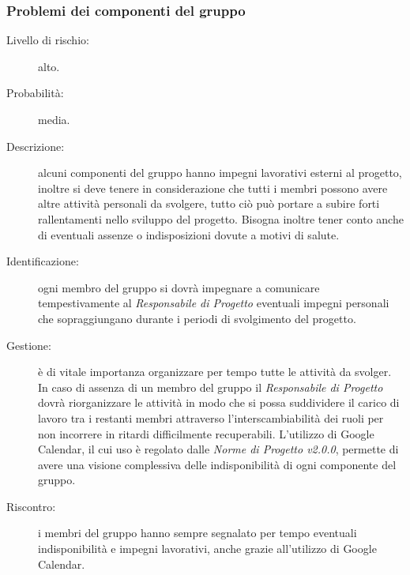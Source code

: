 \subsubsection{Problemi dei componenti del gruppo}
\begin{description}
	\item[Livello di rischio:] alto.
	\item[Probabilità:] media.
	\item[Descrizione:] alcuni componenti del gruppo hanno impegni lavorativi esterni al progetto, inoltre si deve tenere in considerazione che tutti i membri possono avere altre attività personali da svolgere, tutto ciò può portare a subire forti rallentamenti nello sviluppo del progetto. Bisogna inoltre tener conto anche di eventuali assenze o indisposizioni dovute a motivi di salute.
	\item[Identificazione:] ogni membro del gruppo si dovrà impegnare a comunicare tempestivamente al \textit{Responsabile di Progetto} eventuali impegni personali che sopraggiungano durante i periodi di svolgimento del progetto. 
	\item[Gestione:] è di vitale importanza organizzare per tempo tutte le attività da svolger. In caso di assenza di un membro del gruppo il \textit{Responsabile di Progetto} dovrà riorganizzare le attività in modo che si possa suddividere il carico di lavoro tra i restanti membri attraverso l'interscambiabilità dei ruoli per non incorrere in ritardi difficilmente recuperabili. L'utilizzo di \gls{Google Calendar}, il cui uso è regolato dalle \textit{Norme di Progetto v2.0.0}, permette di avere una visione complessiva delle indisponibilità di ogni componente del gruppo. 
	\item[Riscontro:] i membri del gruppo hanno sempre segnalato per tempo eventuali indisponibilità e impegni lavorativi, anche grazie all'utilizzo di \gls{Google Calendar}.
\end{description}
